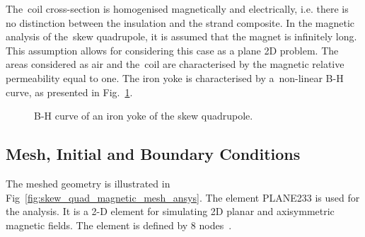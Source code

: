 The~coil cross-section is homogenised magnetically and electrically, i.e. there is no distinction between the insulation and the strand composite. In the magnetic analysis of the~skew quadrupole, it is assumed that the magnet is infinitely long. This assumption allows for considering this case as a plane 2D problem. The areas considered as air and the~coil are characterised by the magnetic relative permeability equal to one. The iron yoke is characterised by a~non-linear B-H curve, as presented in Fig.~\ref{fig:b_h_curve}. 

\begin{figure}[H]
    \centering
    \caption{B-H curve of an iron yoke of the skew quadrupole.}
    \label{fig:b_h_curve}
\end{figure}


\subsection{Mesh, Initial and Boundary Conditions}

The meshed geometry is illustrated in Fig~\ref{fig:skew_quad_magnetic_mesh_ansys}. The element PLANE233 is used for the analysis. It is a 2-D element for simulating 2D planar and axisymmetric magnetic fields. The element is defined by 8 nodes~\cite{ansys_element_manual}.

